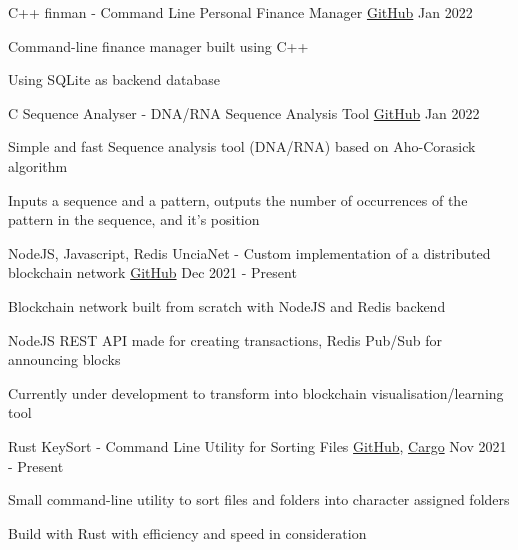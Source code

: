 \begin{cventries}

  \cventry
  {C++}
  {finman - Command Line Personal Finance Manager}
  {\href{https://github.com/UnciaBit/finman}{GitHub}} %
  {Jan 2022}
  {
    \begin{cvitems}
      \item {Command-line finance manager built using C++}
      \item {Using SQLite as backend database}
    \end{cvitems}
  }

  \cventry
  {C}
  {Sequence Analyser - DNA/RNA Sequence Analysis Tool}
  {\href{https://github.com/UnciaBit/Sequence-Analysis}{GitHub}} %
  {Jan 2022}
  {
    \begin{cvitems}
      \item {Simple and fast Sequence analysis tool (DNA/RNA) based on Aho-Corasick algorithm}
      \item {Inputs a sequence and a pattern, outputs the number of occurrences of the pattern in the sequence, and it's position}
    \end{cvitems}
  }



  \cventry
  {NodeJS, Javascript, Redis}
  {UnciaNet - Custom implementation of a distributed blockchain network}
  {\href{https://github.com/UnciaBit/UnciaNet-FE}{GitHub}} %
  {Dec 2021 - Present}
  {
    \begin{cvitems}
      \item {Blockchain network built from scratch with NodeJS and Redis backend}
      \item {NodeJS REST API made for creating transactions, Redis Pub/Sub for announcing blocks}
      \item {Currently under development to transform into blockchain visualisation/learning tool}
    \end{cvitems}
  }


  \cventry
    {Rust} 
    {KeySort - Command Line Utility for Sorting Files}
    {\href{https://github.com/UnciaBit/KeySort-cli}{GitHub}, \href{https://crates.io/crates/keysort}{Cargo}} %
    {Nov 2021 - Present}
    {
      \begin{cvitems}
        \item {Small command-line utility to sort files and folders into character assigned folders}
        \item {Build with Rust with efficiency and speed in consideration}
      \end{cvitems}
    }


\end{cventries}
